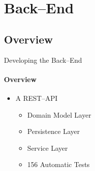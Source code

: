 \author{Troels}
\section{Back--End}
    \subsection{Overview}
        \begin{frame}{Developing the Back--End}\framesubtitle{Overview}
            \begin{itemize}
                \item A REST--API
                \begin{itemize}
                    \item Domain Model Layer
                    \item Persistence Layer
                    \item Service Layer
                    \item 156 Automatic Tests
                \end{itemize}
            \end{itemize}
        \end{frame}
